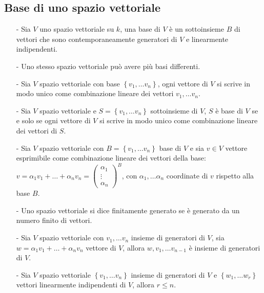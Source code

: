 \documentclass[a4paper]{article}
\begin{document}
\subsection{Base di uno spazio vettoriale}
\begin{itemize}
	\item[-] Sia \(V\) uno spazio vettoriale su \(k\), una base di \(V\) è un sottoinsieme \(B\) di vettori che sono contemporaneamente
	generatori di \(V\) e linearmente indipendenti.
	
	\item[-] Uno stesso spazio vettoriale può avere più basi differenti.
	
	\item[-] Sia \(V\) spazio vettoriale con base \(\left\{ v_1, \dots v_n \right\}\), ogni vettore di \(V\) si scrive in modo
	unico come combinazione lineare dei vettori \(v_1, \dots v_n\).
	
	\item[-] Sia \(V\) spazio vettoriale e \(S = \left\{ v_1, \dots v_n \right\}\) sottoinsieme di \(V\), \(S\) è base di \(V\)
	se e solo se ogni vettore di \(V\) si scrive in modo unico come combinazione lineare dei vettori di \(S\).
	
	\item[-] Sia \(V\) spazio vettoriale con \(B = \left\{ v_1, \dots v_n \right\}\) base di \(V\) e sia \(v \in V\) vettore
	esprimibile come combinazione lineare dei vettori della base: \(v = \alpha_1 v_1 + \dots + \alpha_n v_n = \left( \begin{smallmatrix} \alpha_1 \\ \vdots \\ \alpha_n \end{smallmatrix} \right)^B\),
	con \(\alpha_1, \dots \alpha_n\) coordinate di \(v\) rispetto alla base \(B\).
	
	\item[-] Uno spazio vettoriale si dice finitamente generato se è generato da un numero finito di vettori.
	
	\item[-] Sia \(V\) spazio vettoriale con \(v_1, \dots v_n\) insieme di generatori di \(V\), sia \(w = \alpha_1 v_1 + \dots + \alpha_n v_n\)
	vettore di \(V\), allora \(w, v_1, \dots v_{n-1}\) è insieme di generatori di \(V\).
	
	\item[-] Sia \(V\) spazio vettoriale \(\left\{ v_1, \dots v_n \right\}\) insieme di generatori di \(V\) e \(\left\{ w_1, \dots w_r \right\}\)
	vettori linearmente indipendenti di \(V\), allora \(r \leq n\).
	

\end{itemize}
\end{document}
